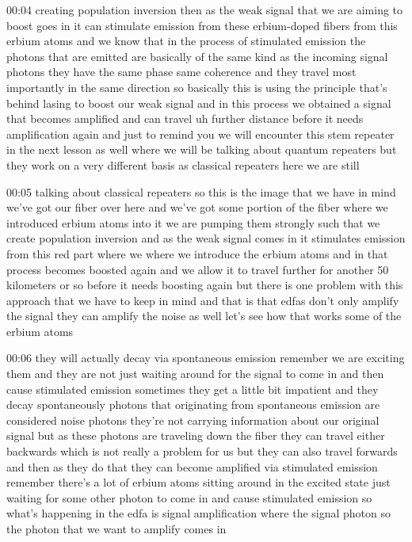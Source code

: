 00:04
creating population inversion then as the weak
signal that we are aiming to boost goes in it can stimulate emission from these
erbium-doped fibers from this erbium atoms and we know that in the process of
stimulated emission the photons that are emitted are basically
of the same kind as the incoming signal photons
they have the same phase same coherence and they travel most importantly in the
same direction so basically this is using the principle that's behind
lasing to boost our weak signal and in this process we obtained a signal that
becomes amplified and can travel uh further distance before it needs
amplification again and just to remind you we will encounter this stem repeater
in the next lesson as well where we will be talking about quantum repeaters
but they work on a very different basis as classical repeaters here we are still

00:05
talking about classical repeaters so this is the image that we have in
mind we've got our fiber over here and we've got some portion of the fiber
where we introduced erbium atoms into it we are pumping them
strongly such that we create population inversion
and as the weak signal comes in it stimulates emission from this
red part where we where we introduce the erbium
atoms and in that process becomes boosted again
and we allow it to travel further for another 50 kilometers or so before it
needs boosting again but there is one problem with this
approach that we have to keep in mind and that is that edfas don't only
amplify the signal they can amplify the noise as well
let's see how that works some of the erbium atoms

00:06
they will actually decay via spontaneous emission remember we are exciting them
and they are not just waiting around for the signal to come in
and then cause stimulated emission sometimes they get a little bit impatient
and they decay spontaneously photons that originating
from spontaneous emission are considered noise
photons they're not carrying information about our original signal
but as these photons are traveling down the fiber
they can travel either backwards which is not really a problem for us
but they can also travel forwards and then as they do that
they can become amplified via stimulated emission
remember there's a lot of erbium atoms sitting around in the excited state
just waiting for some other photon to come in and cause stimulated emission
so what's happening in the edfa is signal amplification where the signal photon
so the photon that we want to amplify comes in

